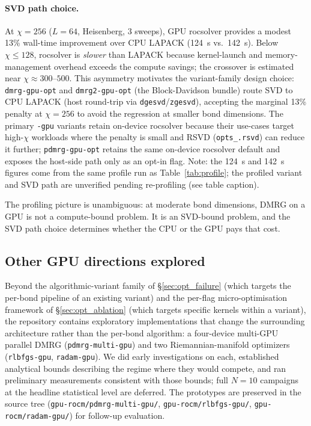 \documentclass[preprint,12pt]{elsarticle}
\begin{document}
\paragraph{SVD path choice.}
At $\chi = 256$ ($L = 64$, Heisenberg, 3 sweeps), GPU rocsolver provides a modest 13\% wall-time improvement over CPU LAPACK (124~s vs.\ 142~s).
Below $\chi \leq 128$, rocsolver is \emph{slower} than LAPACK because kernel-launch and memory-management overhead exceeds the compute savings; the crossover is estimated near $\chi \approx 300$--$500$.
This asymmetry motivates the variant-family design choice: \texttt{dmrg-gpu-opt} and \texttt{dmrg2-gpu-opt} (the Block-Davidson bundle) route SVD to CPU LAPACK (host round-trip via \texttt{dgesvd}/\texttt{zgesvd}), accepting the marginal 13\% penalty at $\chi = 256$ to avoid the regression at smaller bond dimensions.
The primary \texttt{-gpu} variants retain on-device rocsolver because their use-cases target high-$\chi$ workloads where the penalty is small and RSVD (\texttt{opts\_.rsvd}) can reduce it further; \texttt{pdmrg-gpu-opt} retains the same on-device rocsolver default and exposes the host-side path only as an opt-in flag.
Note: the 124~s and 142~s figures come from the same profile run as Table~\ref{tab:profile}; the profiled variant and SVD path are unverified pending re-profiling (see table caption).

The profiling picture is unambiguous: at moderate bond dimensions, DMRG on a GPU is not a compute-bound problem.  It is an SVD-bound problem, and the SVD path choice determines whether the CPU or the GPU pays that cost.

\subsection{Other GPU directions explored}
\label{sec:other_directions}

Beyond the algorithmic-variant family of \S\ref{sec:opt_failure} (which targets the per-bond pipeline of an existing variant) and the per-flag micro-optimisation framework of \S\ref{sec:opt_ablation} (which targets specific kernels within a variant), the repository contains exploratory implementations that change the surrounding architecture rather than the per-bond algorithm: a four-device multi-GPU parallel DMRG (\texttt{pdmrg-multi-gpu}) and two Riemannian-manifold optimizers (\texttt{rlbfgs-gpu}, \texttt{radam-gpu}).  We did early investigations on each, established analytical bounds describing the regime where they would compete, and ran preliminary measurements consistent with those bounds; full $N{=}10$ campaigns at the headline statistical level are deferred.  The prototypes are preserved in the source tree (\texttt{gpu-rocm/pdmrg-multi-gpu/}, \texttt{gpu-rocm/rlbfgs-gpu/}, \texttt{gpu-rocm/radam-gpu/}) for follow-up evaluation.
\end{document}
